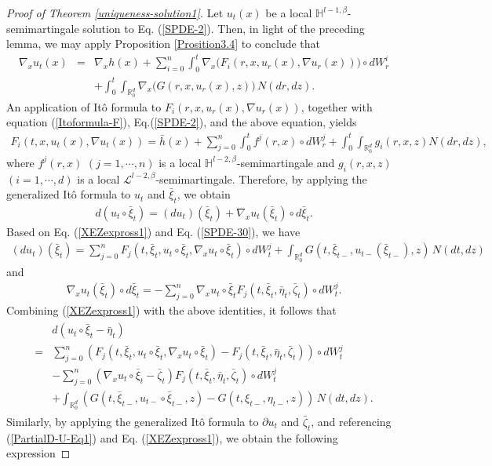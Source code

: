\documentclass[12pt,oneside, reqno]{amsart}
\newcommand{\be}{\begin{eqnarray}}
\newcommand{\ee}{\end{eqnarray}}
\newcommand{\ce}{\begin{eqnarray*}}
\newcommand{\de}{\end{eqnarray*}}
\def\no{\nonumber}
\def\mH{{\mathbb H}}
\def\mR{{\mathbb R}}
\def\sL{{\mathscr L}}
\numberwithin{equation}{section}
\begin{document}
 \begin{proof}[Proof of Theorem \ref{uniqueness-solution1}]
 Let $u_t(x)$ be a local $\mH^{l-1,\beta}$-semimartingale solution to Eq. (\ref{SPDE-2}). Then, in light of the preceding lemma, we may apply Proposition \ref{Prosition3.4} to conclude that
 \be\label{PartialD-U-Eq1}
\nabla_x u_t(x)&=&\nabla_x h(x)+\sum_{i=0}^{n}\int_0^t \nabla_x \big(F_i(r,x,u_r(x),\nabla u_r(x))\big)\circ dW_r^i\no\\
 &&+\int_0^t\int_{\mR^d_0} \nabla_x \big(G(r,x,u_r(x),z)\big)\,N(dr,dz).
 \ee
An application of It\^{o} formula to  $F_i(r,x,u_r(x),\nabla u_r(x))$, together with equation (\ref{Itoformula-F}), Eq.(\ref{SPDE-2}), and the above equation, yields
 \ce 
 F_i(t,x,u_t(x),\nabla u_t(x))=\bar{h}(x)+\sum_{j=0}^n\int_0^t f^j(r,x)\circ dW_r^j+\int_0^t\int_{\mR^d_0} g_i(r,x,z) N(dr,dz),
 \de 
 where $f^j(r,x)$ $(j=1,\cdots,n)$ is a  local $\mH^{l-2,\beta}$-semimartingale and $g_i(r,x,z)$ $(i=1,\cdots,d)$ is a local $\sL^{l-2,\beta}$-semimartingale.
  Therefore, by applying the generalized  It\^{o} formula to $u_t$ and $\bar{\xi}_t$, we obtain 
 \ce 
 d(u_t\circ \bar{\xi}_t)=(du_t)(\bar{\xi}_t)+\nabla_x u_t(\bar{\xi}_t)\circ d\bar{\xi}_t.
 \de 
 Based on Eq. (\ref{XEZexpross1}) and Eq. (\ref{SPDE-30}), we have 
 \ce 
 (du_t)(\bar{\xi}_t)
 =\sum_{j=0}^nF_j(t,\bar{\xi}_t, u_t\circ \bar{\xi}_t,\nabla_x u_t\circ\bar{\xi}_t)\circ dW_t^j+\int_{\mR^d_0} G(t,\bar{\xi}_{t-},u_{t-}(\bar{\xi}_{t-}),z)\,N(dt,dz)
 \de 
 and 
  \ce 
 \nabla_x u_t(\bar{\xi}_t)\circ d\bar{\xi}_t=-\sum_{j=0}^n \nabla_x u_t\circ\bar{\xi}_t F_j(t,\bar{\xi}_t, \bar{\eta}_t,  \bar{\zeta}_t)\circ dW_t^j.
 \de 
 Combining (\ref{XEZexpross1}) with the above identities, it follows that
 \be\label{TuozhanEq1}
 \begin{split}
 &d(u_t\circ \bar{\xi}_t-\bar{\eta}_t)\\
 =&\sum_{j=0}^n\left(F_j(t,\bar{\xi}_t, u_t\circ \bar{\xi}_t,\nabla_x u_t\circ\bar{\xi}_t)- F_j(t,\bar{\xi}_t, \bar{\eta}_t,  \bar{\zeta}_t)\right)\circ dW_t^j\\
 &-\sum_{j=0}^n\left(\nabla_x u_t\circ\bar{\xi}_t-\bar{\zeta}_t\right) F_j(t,\bar{\xi}_t, \bar{\eta}_t, \bar{\zeta}_t)\circ dW_t^j\\
 &+\int_{\mR^d_0}\left( G(t,\bar{\xi}_{t-},u_{t-}\circ\bar{\xi}_{t-},z)-G(t,\xi_{t-},\eta_{t-},z)\right)\,N(dt,dz).
\end{split}
 \ee
 Similarly, by applying the generalized  It\^{o} formula to $\partial u_t$ and $\bar{\zeta}_t$, and referencing  (\ref{PartialD-U-Eq1}) and Eq. (\ref{XEZexpross1}),  we obtain the following expression

\end{proof}
\end{document}
